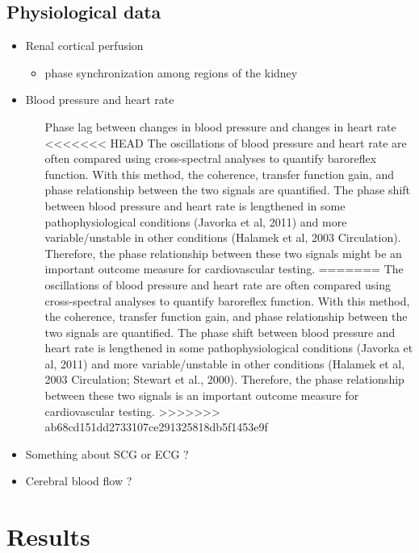 \documentclass{article}
\begin{document}
\begin{itemize}
\subsection*{Physiological data}
\begin{itemize}
\item Renal cortical perfusion
	\begin{itemize}
	\item phase synchronization among regions of the kidney
	\end{itemize}
\item Blood pressure and heart rate
	\begin{itemize}
	\item [Phase lag between changes in blood pressure and changes in heart rate] \hfill \\
<<<<<<< HEAD
	The oscillations of blood pressure and heart rate are often compared using cross-spectral analyses to quantify baroreflex function.  With this method, the coherence, transfer function gain, and phase relationship between the two signals are quantified.  The phase shift between blood pressure and heart rate is lengthened in some pathophysiological conditions (Javorka et al, 2011) and more variable/unstable in other conditions (Halamek et al, 2003 Circulation).  Therefore, the phase relationship between these two signals might be an important outcome measure for cardiovascular testing.  
=======
	The oscillations of blood pressure and heart rate are often compared using cross-spectral analyses to quantify baroreflex function.  With this method, the coherence, transfer function gain, and phase relationship between the two signals are quantified.  The phase shift between blood pressure and heart rate is lengthened in some pathophysiological conditions (Javorka et al, 2011) and more variable/unstable in other conditions (Halamek et al, 2003 Circulation; Stewart et al., 2000).  Therefore, the phase relationship between these two signals is an important outcome measure for cardiovascular testing.  
>>>>>>> ab68cd151dd2733107ce291325818db5f1453e9f
	\end{itemize}
\item Something about SCG or ECG ?
\item Cerebral blood flow ?
\end{itemize}

\end{itemize}

\section*{Results}
\end{document}
